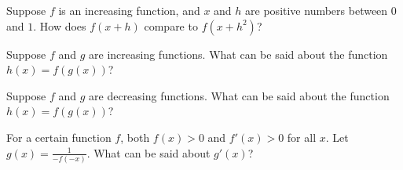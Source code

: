\documentclass{ximera}
\newcommand{\recommendation}[1]{}
\begin{document}
\begin{shuffle}
\begin{problem}
  Suppose $f$ is an increasing function, and $x$ and $h$ are positive numbers between $0$ and $1$.  How does $f(x + h)$ compare to $f(x + h^2)$?
  \begin{multipleChoice}
  \end{multipleChoice}
\end{problem}

\begin{problem}
  Suppose $f$ and $g$ are increasing functions.  What can be said about the function $h(x) = f(g(x))$?
  \begin{multipleChoice}
  \end{multipleChoice}
\end{problem}

\begin{problem}
  Suppose $f$ and $g$ are decreasing functions.  What can be said about the function $h(x) = f(g(x))$?
  \begin{multipleChoice}
  \end{multipleChoice}
\end{problem}

\begin{problem}
  For a certain function $f$, both $f(x) > 0$ and $f'(x) > 0$ for all $x$.  Let $g(x) = \frac{1}{-f(-x)}$.  What can be said about $g'(x)$?
  \begin{multipleChoice}
  \end{multipleChoice}
\end{problem}





\end{shuffle}
\end{document}
